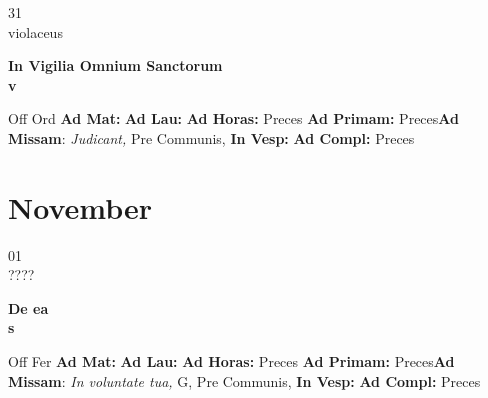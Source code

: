 \documentclass[10pt, openany]{book}
\begin{document}
    \begin{center}
        \begin{minipage}{3.5in}
            \vspace{2em}
            \begin{minipage}{0.5in}
                {\Huge 31} \\
                {\normalsize violaceus}
            \end{minipage}
            \begin{minipage}{3.0in}
                \textbf{ \large In Vigilia Omnium Sanctorum \\
                \textnormal{\normalsize v}}

            \end{minipage}
            \begin{justify}Off Ord
                \textbf{Ad Mat: }
                \textbf{Ad Lau: }
                \textbf{Ad Horas: }Preces
                \textbf{Ad Primam: }Preces\textbf{Ad Missam}: \textit{Judicant,} Pre Communis, 
                \textbf{In Vesp: }
                \textbf{Ad Compl: }Preces
            \end{justify}
        \end{minipage}
    \end{center}

    \chapter{November}
                    
    \begin{center}
        \begin{minipage}{3.5in}
            \vspace{2em}
            \begin{minipage}{0.5in}
                {\Huge 01} \\
                {\normalsize ????}
            \end{minipage}
            \begin{minipage}{3.0in}
                \textbf{ \large De ea \\
                \textnormal{\normalsize s}}

            \end{minipage}
            \begin{justify}Off Fer
                \textbf{Ad Mat: }
                \textbf{Ad Lau: }
                \textbf{Ad Horas: }Preces
                \textbf{Ad Primam: }Preces\textbf{Ad Missam}: \textit{In voluntate tua,} G, Pre Communis, 
                \textbf{In Vesp: }
                \textbf{Ad Compl: }Preces
            \end{justify}
        \end{minipage}
    \end{center}
\end{document}
